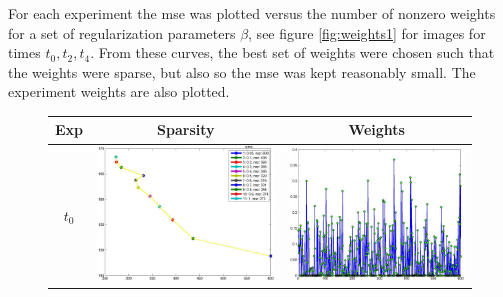 \documentclass[english]{siamltex}
\begin{document}
{For each experiment the {\sf mse} was plotted versus the number of nonzero weights for a set of regularization parameters $\beta$, see figure \ref{fig:weights1} for images for times $t_0,t_2,t_4$. From these curves, the best set of weights were chosen such that the weights were sparse, but also so the {\sf mse} was kept reasonably small. The experiment weights are also plotted.  
\begin{figure}[!h]
	\renewcommand{\arraystretch}{1.5}
	\begin{center}
		\iwidth=80mm
		\begin{tabular}{|c|c|c|} %
			\hline		
			Exp & Sparsity & Weights	\\
			\hline	
			$t_0$
			&	
			\includegraphics[width=.8\iwidth]{figures/newFigs/exp1paretoWeights}
			&
			\includegraphics[width=.8\iwidth]{figures/newFigs/exp1Weights}\\

\end{tabular}
\end{center}
\end{figure}}
\end{document}

